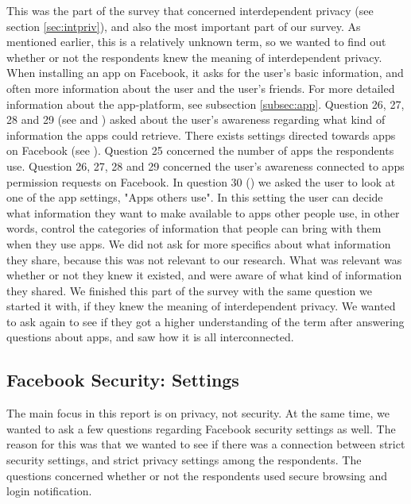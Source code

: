 This was the part of the survey that concerned interdependent privacy (see section \ref{sec:intpriv}), and also the most important part of our survey. As mentioned earlier, this is a relatively unknown term, so we wanted to find out whether or not the respondents knew the meaning of interdependent privacy. When installing an app on Facebook, it asks for the user's basic information, and often more information about the user and the user's friends. For more detailed information about the app-platform, see subsection \ref{subsec:app}. Question 26, 27, 28 and 29 (see  and ) asked about the user's awareness regarding what kind of information the apps could retrieve. There exists settings directed towards apps on Facebook (see ). Question 25 concerned the number of apps the respondents use. Question 26, 27, 28 and 29 concerned the user's awareness connected to apps permission requests on Facebook. In question 30 () we asked the user to look at one of the app settings, "Apps others use". In this setting the user can decide what information they want to make available to apps other people use, in other words, control the categories of information that people can bring with them when they use apps. We did not ask for more specifics about what information they share, because this was not relevant to our research. What was relevant was whether or not they knew it existed, and were aware of what kind of information they shared. We finished this part of the survey with the same question we started it with, if they knew the meaning of interdependent privacy. We wanted to ask again to see if they got a higher understanding of the term after answering questions about apps, and saw how it is all interconnected. 


\subsection{Facebook Security: Settings}
The main focus in this report is on privacy, not security. At the same time, we wanted to ask a few questions regarding Facebook security settings as well. The reason for this was that we wanted to see if there was a connection between strict security settings, and strict privacy settings among the respondents. The questions concerned whether or not the respondents used secure browsing and login notification.

